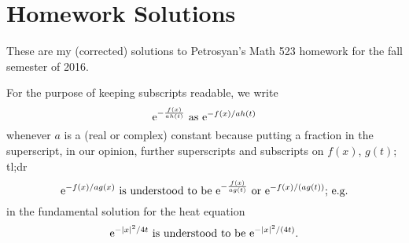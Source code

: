 \section{Homework Solutions}
These are my (corrected) solutions to Petrosyan's Math 523 homework for the
fall semester of 2016.

For the purpose of keeping subscripts readable, we write
\[
  \mathrm{e}^{-\frac{f(x)}{ah(t)}}\text{ as }\mathrm{e}^{-f(x)/ah(t)}
\]
whenever \(a\) is a (real or complex) constant because putting a fraction
in the superscript, in our opinion,
further superscripts and subscripts on \(f(x)\), \(g(t)\); tl;dr
\[
  \mathrm{e}^{-f(x)/ag(x)}\text{ is understood to be }\mathrm{e}^{-\frac{f(x)}{ag(t)}}
  \text{ or }\mathrm{e}^{-f(x)/(ag(t))}\text{; e.g.}
\]
in the fundamental solution for the heat equation
\[
  \mathrm{e}^{-|x|^2/4t}\text{ is understood to be }\mathrm{e}^{-|x|^2/(4t)}.
\]

